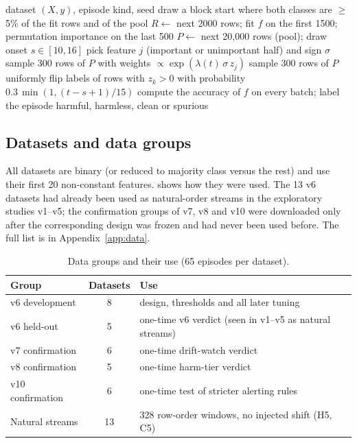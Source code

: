 \begin{algorithm}[H]
\caption{Building one benchmark episode}
\label{alg:episode}
\begin{algorithmic}[1]
\Require dataset $(X, y)$, episode kind, seed
\State draw a block start where both classes are $\geq$5\% of the fit rows and of the pool
\State $R \gets$ next 2000 rows; fit $f$ on the first 1500; permutation importance on the last 500
\State $P \gets$ next 20{,}000 rows (pool); draw onset $s \in [10,16]$
 \State pick feature $j$ (important or unimportant half) and sign $\sigma$ \EndIf
{}
    \State sample 300 rows of $P$ with weights $\propto \exp(\lambda(t)\,\sigma\, z_j)$
  \Else
    \State sample 300 rows of $P$ uniformly
  \EndIf
   \State flip labels of rows with $z_k > 0$ with probability $0.3\,\min(1, (t-s+1)/15)$ \EndIf
\EndFor
\State compute the accuracy of $f$ on every batch; label the episode harmful, harmless, clean or spurious
\end{algorithmic}
\end{algorithm}

\subsection{Datasets and data groups}
All datasets are binary (or reduced to majority class versus the rest) and use their first 20 non-constant features.  shows how they were used. The 13 v6 datasets had already been used as natural-order streams in the exploratory studies v1--v5; the confirmation groups of v7, v8 and v10 were downloaded only after the corresponding design was frozen and had never been used before. The full list is in Appendix~\ref{app:data}.

\begin{table}[H]
\caption{Data groups and their use (65 episodes per dataset).}
\label{tab:groups}
\centering
\small
\begin{tabular}{@{}lcl@{}}
\toprule
Group & Datasets & Use \\
\midrule
v6 development & 8 & design, thresholds and all later tuning \\
v6 held-out & 5 & one-time v6 verdict (seen in v1--v5 as natural streams) \\
v7 confirmation & 6 & one-time drift-watch verdict \\
v8 confirmation & 5 & one-time harm-tier verdict \\
v10 confirmation & 6 & one-time test of stricter alerting rules \\
Natural streams & 13 & 328 row-order windows, no injected shift (H5, C5) \\
\bottomrule
\end{tabular}
\end{table}

